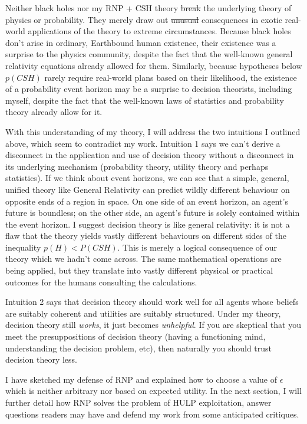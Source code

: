 \documentclass{article}
\providecommand{\DIFadd}[1]{{\protect\color{blue}\uwave{#1}}} %
\providecommand{\DIFdel}[1]{{\protect\color{red}\sout{#1}}}                      %
\providecommand{\DIFaddbegin}{} %
\providecommand{\DIFaddend}{} %
\providecommand{\DIFdelbegin}{} %
\providecommand{\DIFdelend}{} %
\begin{document}
Neither black holes nor my RNP + CSH theory \DIFdelbegin \DIFdel{break }\DIFdelend \DIFaddbegin \DIFadd{conflict with }\DIFaddend the underlying theory of physics or probability. They merely draw out \DIFdelbegin \DIFdel{unusual }\DIFdelend \DIFaddbegin \DIFadd{unintuitive }\DIFaddend consequences in exotic real-world applications of the theory to extreme circumstances. Because black holes don't arise in ordinary, Earthbound human existence, their existence was a surprise to the physics community, despite the fact that the well-known general relativity equations already allowed for them. Similarly, because hypotheses below \(p(CSH)\) rarely require real-world plans based on their likelihood, the existence of a probability event horizon may be a surprise to decision theorists, including myself, despite the fact that the well-known laws of statistics and probability theory already allow for it.

With this understanding of my theory, I will address the two intuitions I outlined above, which seem to contradict my work. Intuition 1 says we can't derive a disconnect in the application and use of decision theory without a disconnect in its underlying mechanism (probability theory, utility theory and perhaps statistics). If we think about event horizons, we can see that a simple, general, unified theory like General Relativity can predict wildly different behaviour on opposite ends of a region in space. On one side of an event horizon, an agent's future is boundless; on the other side, an agent's future is solely contained within the event horizon. I suggest decision theory is like general relativity: it is not a flaw that the theory yields vastly different behaviours on different sides of the inequality \(p(H)<P(CSH)\). This is merely a logical consequence of our theory which we hadn't come across. The same mathematical operations are being applied, but they translate into vastly different physical or practical outcomes for the humans consulting the calculations.

Intuition 2 says that decision theory should work well for all agents whose beliefs are suitably coherent and utilities are suitably structured. Under my theory, decision theory still \textit{works}, it just becomes \textit{unhelpful}. If you are skeptical that you meet the presuppositions of decision theory (having a functioning mind, understanding the decision problem, etc), then naturally you should trust decision theory less.

I have sketched my defense of RNP and explained how to choose a value of \(\epsilon\) which is neither arbitrary nor based on expected utility. In the next section, I will further detail how RNP solves the problem of HULP exploitation, answer questions readers may have and defend my work from some anticipated critiques. 
\end{document}
